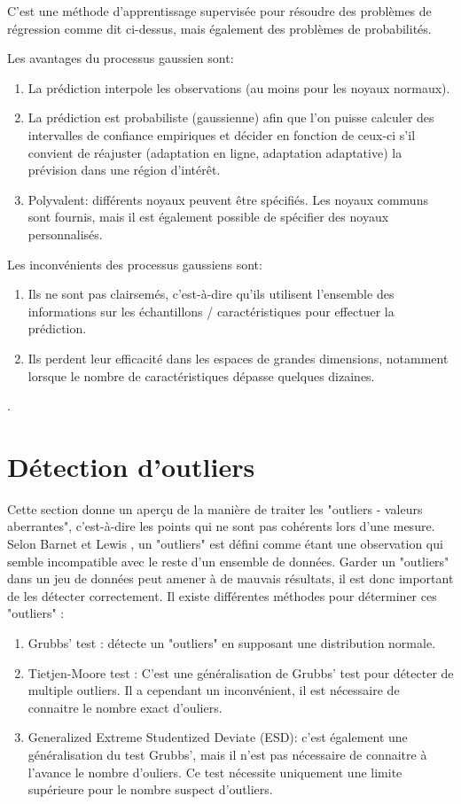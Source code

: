 C'est une méthode d'apprentissage supervisée pour résoudre des problèmes de régression comme dit ci-dessus, mais également des problèmes de probabilités. 

Les avantages du processus gaussien sont:

\begin{enumerate}
 \item La prédiction interpole les observations (au moins pour les noyaux normaux).
 \item La prédiction est probabiliste (gaussienne) afin que l’on puisse calculer des intervalles de confiance empiriques et décider en fonction de ceux-ci s’il convient de réajuster (adaptation en ligne, adaptation adaptative) la prévision dans une région d’intérêt.
 \item Polyvalent: différents noyaux peuvent être spécifiés. Les noyaux communs sont fournis, mais il est également possible de spécifier des noyaux personnalisés.
\end{enumerate}

Les inconvénients des processus gaussiens sont:

\begin{enumerate}
 \item Ils ne sont pas clairsemés, c’est-à-dire qu’ils utilisent l’ensemble des informations sur les échantillons / caractéristiques pour effectuer la prédiction.
 \item Ils perdent leur efficacité dans les espaces de grandes dimensions, notamment lorsque le nombre de caractéristiques dépasse quelques dizaines.
\end{enumerate} 

\cite{scikit}. 

\section{ Détection d'outliers \cite{ML_indoor}}
Cette section donne un aperçu de la manière de traiter les "outliers - valeurs aberrantes", c'est-à-dire les points qui ne sont pas cohérents lors d'une mesure. Selon Barnet et Lewis \cite{Outliers}, un "outliers" est défini comme étant une observation qui semble incompatible avec le reste d'un ensemble de données.
Garder un "outliers" dans un jeu de données peut amener à de mauvais résultats, il est donc important de les détecter correctement. Il existe différentes méthodes pour déterminer ces "outliers" :

\begin{enumerate}
 \item Grubbs' test : détecte un "outliers" en supposant une distribution normale.
 \item Tietjen-Moore test : C'est une généralisation de Grubbs' test pour détecter de multiple outliers. Il a cependant un inconvénient, il est nécessaire de connaitre le nombre exact d'ouliers.
 \item Generalized Extreme Studentized Deviate (ESD): c'est également une généralisation du test Grubbs', mais il n'est pas nécessaire de connaitre à l'avance le nombre d'ouliers. Ce test nécessite uniquement une limite supérieure pour le nombre suspect d'outliers.\cite{ESD}
\end{enumerate}

